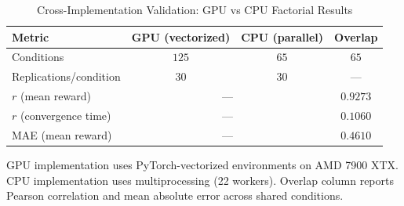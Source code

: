 \begin{table}[ht]
\centering
\caption{Cross-Implementation Validation: GPU vs CPU Factorial Results}
\label{tab:marl-cross-validation}
\begin{tabular}{@{}lccc@{}}
\toprule
\textbf{Metric} & \textbf{GPU (vectorized)} & \textbf{CPU (parallel)} & \textbf{Overlap} \\
\midrule
Conditions & $125$ & $65$ & $65$ \\
Replications/condition & $30$ & $30$ & --- \\
$r$ (mean reward) & \multicolumn{2}{c}{---} & $0.9273$ \\
$r$ (convergence time) & \multicolumn{2}{c}{---} & $0.1060$ \\
MAE (mean reward) & \multicolumn{2}{c}{---} & $0.4610$ \\
\bottomrule
\end{tabular}
\begin{tablenotes}
\small
\item GPU implementation uses PyTorch-vectorized environments on AMD 7900 XTX. CPU implementation uses multiprocessing (22 workers). Overlap column reports Pearson correlation and mean absolute error across shared conditions.
\end{tablenotes}
\end{table}
